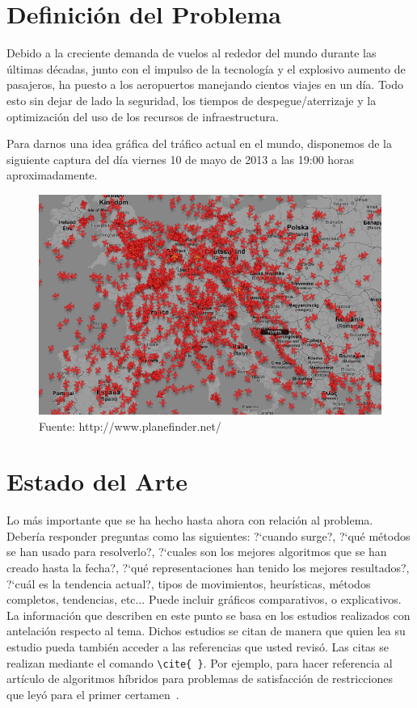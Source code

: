 \documentclass[letter, 11pt]{article}
\begin{document}
\section{Definición del Problema}
Debido a la creciente demanda de vuelos al rededor del mundo durante las últimas décadas, junto con el impulso de la tecnología y el explosivo aumento de pasajeros, ha puesto a los aeropuertos manejando cientos viajes en un día. Todo esto sin dejar de lado la seguridad, los tiempos de despegue/aterrizaje y la optimización del uso de los recursos de infraestructura.

Para darnos una idea gráfica del tráfico actual en el mundo, disponemos de la siguiente captura del día viernes 10 de mayo de 2013 a las 19:00 horas aproximadamente.
\begin{figure}[!h]
\includegraphics[width=13.5cm]{aviones.png}
\centering
\caption{Fuente: http://www.planefinder.net/}
\end{figure}

\section{Estado del Arte}
Lo m\'as importante que se ha hecho hasta ahora con relaci\'on al problema. Deber\'ia responder preguntas como las siguientes:
?`cuando surge?, ?`qu\'e m\'etodos se han usado para resolverlo?, ?`cuales son los mejores algoritmos que se han creado hasta
la fecha?, ?`qu\'e representaciones han tenido los mejores resultados?, ?`cu\'al es la tendencia actual?, tipos de movimientos,
heur\'isticas, m\'etodos completos, tendencias, etc... Puede incluir gr\'aficos comparativos, o explicativos.\\
La informaci\'on que describen en este punto se basa en los estudios realizados con antelaci\'on respecto al tema.
Dichos estudios se citan de manera que quien lea su estudio pueda tambi\'en
 acceder a las referencias que usted revis\'o. Las citas se realizan mediante el comando \verb+\cite{ }+.
Por ejemplo, para hacer referencia al art\'iculo de algoritmos h\'ibridos para problemas de satisfacci\'on 
 de restricciones que ley\'o para el primer certamen~\cite{Prosser93Hybrid}.
\end{document}
